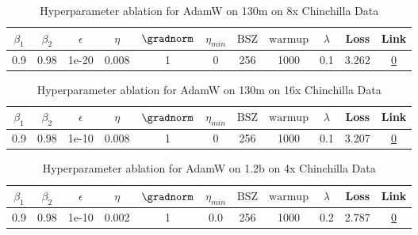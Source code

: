 \begin{table}[H]
\centering
\caption{Hyperparameter ablation for AdamW on 130m on 8x Chinchilla Data}
\label{tab:ablation_adamw_130m_8}
\begin{tabular}{ccccccccccc}
\toprule
$\beta_1$ & $\beta_2$ & $\epsilon$ & $\eta$ & $\gradnorm$ & $\eta_{min}$ & $\mathrm{BSZ}$ & $\mathrm{warmup}$ & $\lambda$ & Loss & Link \\
\midrule
0.9 & 0.98 & 1e-20 & 0.008 & 1 & 0 & 256 & 1000 & 0.1 & 3.262 & \href{https://wandb.ai/stanford-mercury/optimizer-scaling/runs/sweep-130m-21B-adamwc00703lr0.008-wd0.1-minlr0-warmup1000-b10.9--d73c2c}{0} \\
\midrule
\bottomrule
\end{tabular}
\end{table}

\begin{table}[H]
\centering
\caption{Hyperparameter ablation for AdamW on 130m on 16x Chinchilla Data}
\label{tab:ablation_adamw_130m_16}
\begin{tabular}{ccccccccccc}
\toprule
$\beta_1$ & $\beta_2$ & $\epsilon$ & $\eta$ & $\gradnorm$ & $\eta_{min}$ & $\mathrm{BSZ}$ & $\mathrm{warmup}$ & $\lambda$ & Loss & Link \\
\midrule
0.9 & 0.98 & 1e-10 & 0.008 & 1 & 0 & 256 & 1000 & 0.1 & 3.207 & \href{https://wandb.ai/stanford-mercury/optimizer-scaling/runs/sweep-130m-42B-adamwdf6bfb1lr0.008-wd0.1-minlr0-warmup1000-b10.9-c5d61d}{0} \\
\midrule
\bottomrule
\end{tabular}
\end{table}

\begin{table}[H]
\centering
\caption{Hyperparameter ablation for AdamW on 1.2b on 4x Chinchilla Data}
\label{tab:ablation_adamw_1.2b_4}
\begin{tabular}{ccccccccccc}
\toprule
$\beta_1$ & $\beta_2$ & $\epsilon$ & $\eta$ & $\gradnorm$ & $\eta_{min}$ & $\mathrm{BSZ}$ & $\mathrm{warmup}$ & $\lambda$ & Loss & Link \\
\midrule
0.9 & 0.98 & 1e-10 & 0.002 & 1 & 0.0 & 256 & 1000 & 0.2 & 2.787 & \href{https://wandb.ai/stanford-mercury/optimizer-scaling/runs/sweep-1.2b-96B-adamw71c224lr0.002-wd0.2-minlr0.0-warmup1000-b10.-66682a}{0} \\
\midrule
\bottomrule
\end{tabular}
\end{table}

